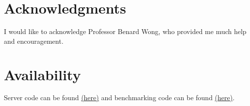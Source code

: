 \documentclass[sigconf]{acmart}
\begin{document}
\section{Acknowledgments}
I would like to acknowledge Professor Benard Wong, who provided me much help and encouragement.


\section{Availability}
Server code can be found \href{https://github.com/bryantcurto/redis/compare/6.0...iouring}{(here)} and benchmarking code can be found \href{https://github.com/bryantcurto/redis/compare/6.0...test-iouring}{(here)}.




\end{document}
